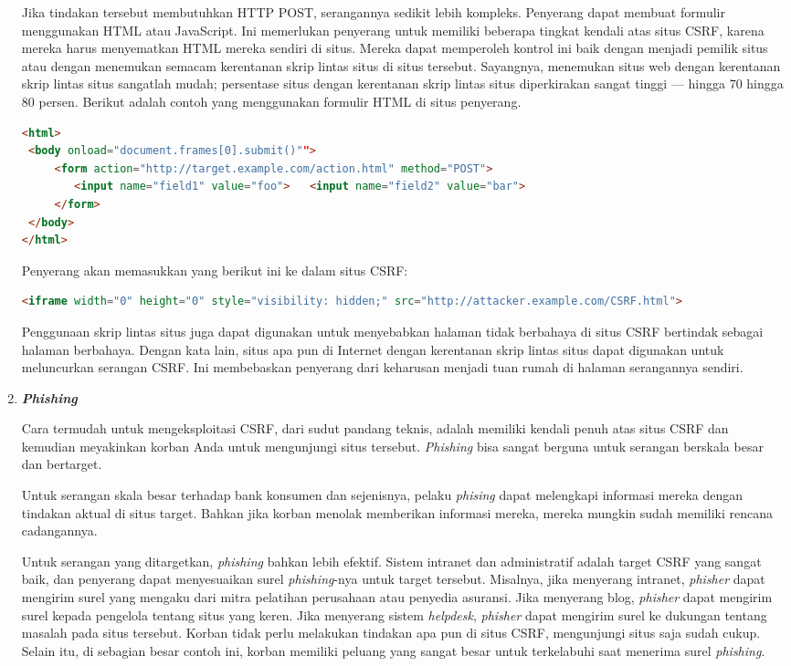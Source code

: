 \documentclass{article}
\begin{document}
\begin{enumerate}
Jika tindakan tersebut membutuhkan HTTP POST, serangannya sedikit lebih kompleks. Penyerang dapat membuat formulir menggunakan HTML atau JavaScript. Ini memerlukan penyerang untuk memiliki beberapa tingkat kendali atas situs CSRF, karena mereka harus menyematkan HTML mereka sendiri di situs. Mereka dapat memperoleh kontrol ini baik dengan menjadi pemilik situs atau dengan menemukan semacam kerentanan skrip lintas situs di situs tersebut. Sayangnya, menemukan situs web dengan kerentanan skrip lintas situs sangatlah mudah; persentase situs dengan kerentanan skrip lintas situs diperkirakan sangat tinggi — hingga 70 hingga 80 persen. Berikut adalah contoh yang menggunakan formulir HTML di situs penyerang.
\begin{lstlisting}[language=HTML]
<html>
 <body onload="document.frames[0].submit()"">
     <form action="http://target.example.com/action.html" method="POST">
        <input name="field1" value="foo">   <input name="field2" value="bar">  
     </form> 
 </body>
</html>
\end{lstlisting}
Penyerang akan memasukkan yang berikut ini ke dalam situs CSRF:
\begin{lstlisting}[language=HTML]
<iframe width="0" height="0" style="visibility: hidden;" src="http://attacker.example.com/CSRF.html">
\end{lstlisting}
Penggunaan skrip lintas situs juga dapat digunakan untuk menyebabkan halaman tidak berbahaya di situs CSRF bertindak sebagai halaman berbahaya. Dengan kata lain, situs apa pun di Internet dengan kerentanan skrip lintas situs dapat digunakan untuk meluncurkan serangan CSRF. Ini membebaskan penyerang dari keharusan menjadi tuan rumah di halaman serangannya sendiri.
\item \textit{\textbf{Phishing}}

Cara termudah untuk mengeksploitasi CSRF, dari sudut pandang teknis, adalah memiliki kendali penuh atas situs CSRF dan kemudian meyakinkan korban Anda untuk mengunjungi situs tersebut. \textit{Phishing} bisa sangat berguna untuk serangan berskala besar dan bertarget.

Untuk serangan skala besar terhadap bank konsumen dan sejenisnya, pelaku \textit{phising} dapat melengkapi informasi mereka dengan tindakan aktual di situs target. Bahkan jika korban menolak memberikan informasi mereka, mereka mungkin sudah memiliki rencana cadangannya.

Untuk serangan yang ditargetkan, \textit{phishing} bahkan lebih efektif. Sistem intranet dan administratif adalah target CSRF yang sangat baik, dan penyerang dapat menyesuaikan surel \textit{phishing}-nya untuk target tersebut. Misalnya, jika menyerang intranet, \textit{phisher} dapat mengirim surel yang mengaku dari mitra pelatihan perusahaan atau penyedia asuransi. Jika menyerang blog, \textit{phisher} dapat mengirim surel kepada pengelola tentang situs yang keren. Jika menyerang sistem \textit{helpdesk}, \textit{phisher} dapat mengirim surel ke dukungan tentang masalah pada situs tersebut. Korban tidak perlu melakukan tindakan apa pun di situs CSRF, mengunjungi situs saja sudah cukup. Selain itu, di sebagian besar contoh ini, korban memiliki peluang yang sangat besar untuk terkelabuhi saat menerima surel \textit{phishing}.


\end{enumerate}
\end{document}
